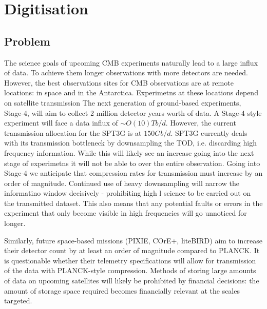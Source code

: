 \documentclass[apj]{emulateapj}
\begin{document}





\section{Digitisation}
\label{sec:dig}

\subsection{Problem}
\label{subsec:problem}


The science goals of upcoming CMB experiments naturally lead to a large influx of data. To achieve them longer observations with more detectors are needed. However, the best observations sites for CMB observations are at remote locations: in space and in the Antarctica. Experimetns at these locations depend on satellite transmission The next generation of ground-based experiments, Stage-4, will aim to collect 2 million detector years worth of data. A Stage-4 style experiment will face a data influx of $\sim O(10)Tb/d$. However, the current transmission allocation for the SPT3G is at $150Gb/d$. SPT3G currently deals with its transmission bottleneck by downsampling the TOD, i.e. discarding high frequency information. While this will likely see an increase going into the next stage of experimetns it will not be able to over the entire observation. Going into Stage-4 we anticipate that compression rates for transmission must increase by an order of magnitude. Continued use of heavy downsampling will narrow the informatino window decisively - prohibiting high l science to be carried out on the transmitted dataset. This also means that any potential faults or errors in the experiment that only become visible in high frequencies will go unnoticed for longer.

Similarly, future space-based missions (PIXIE, COrE+, liteBIRD) aim to increase their detector count by at least an order of magnitude compared to PLANCK. It is questionable whether their telemetry specifications will allow for transmission of the data with PLANCK-style compression. Methods of storing large amounts of data on upcoming satellites will likely be prohibited by financial decisions: the amount of storage space required becomes financially relevant at the scales targeted.
\end{document}
